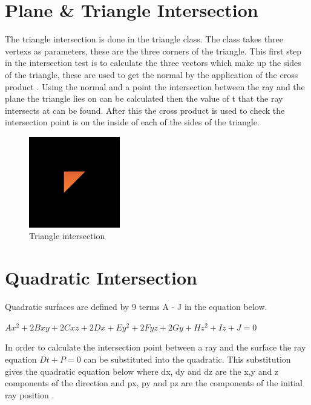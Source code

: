 \documentclass{article}
\begin{document}
\section{Plane \& Triangle Intersection}

The triangle intersection is done in the triangle class. The class takes three
vertexs as parameters, these are the three corners of the triangle. This first step in the
intersection test is to calculate the three vectors which make up the sides
of the triangle, these are used to get the normal by the application of the
cross product \cite{triabgle}. Using the normal and a point the intersection between the
ray and the plane the triangle lies on can be calculated then the value of t that
the ray intersects at can be found. After this the cross product is used to check
the intersection point is on the inside of each of the sides of the triangle.

\begin{figure}[H]
  \begin{center}
  \includegraphics[width=150px]{Images/triangle.png}
  \caption{Triangle intersection}
  \label{fig:triint}
  \end{center}
\end{figure}

\section{Quadratic Intersection}

Quadratic surfaces are defined by 9 terms A - J in the equation below.

\begin{center}
$Ax^2 + 2Bxy + 2Cxz + 2Dx + Ey^2 + 2Fyz + 2Gy + Hz^2 + Iz + J = 0$
\end{center}

In order to calculate the intersection point between a ray and the surface the
ray equation $Dt + P = 0$ can be substituted into the quadratic. This substitution gives the
quadratic equation below where dx, dy and dz are the x,y and z components of the
direction and px, py and pz are the components of the initial ray position \cite{quadratic}.
\end{document}
